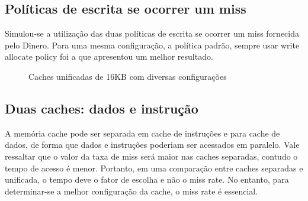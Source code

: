 \documentclass[10pt,a4paper]{article}
\begin{document}
\subsection{Políticas de escrita se ocorrer um miss}
Simulou-se a utilização das duas políticas de escrita se ocorrer um
miss fornecida pelo Dinero.
Para uma mesma configuração, a política padrão, sempre usar write allocate policy foi a que apresentou um
melhor resultado.

\begin{figure}[h!]
\caption{Caches unificadas de 16KB com diversas configurações}
\end{figure}

\subsection{Duas caches:  dados e  instrução}
A memória cache pode ser separada em cache de instruções e para cache de dados,
de forma que dados e instruções poderiam ser acessados em paralelo. 
Vale ressaltar que o valor da taxa de miss será maior nas caches
separadas, contudo o tempo de acesso é menor.
Portanto, em uma comparação entre caches separadas e unificada, o tempo deve o fator de
escolha e não o miss rate. 
No entanto, para determinar-se a melhor configuração da cache, o miss
rate é essencial.
\end{document}
